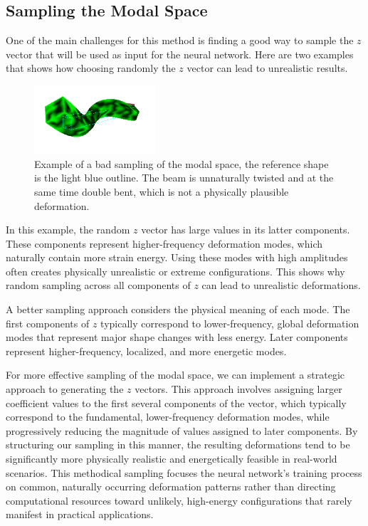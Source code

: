\subsection{Sampling the Modal Space}
\label{sec:sampling_modal_space}
One of the main challenges for this method is finding a good way to sample the \(z\) vector that will be used as input for the neural network. Here are two examples that shows how choosing randomly the \(z\) vector can lead to unrealistic results. 
\begin{figure}[H]
    \centering
    \includegraphics[width=0.4\textwidth]{Images/z_random.png}
    \caption{Example of a bad sampling of the modal space, the reference shape is the light blue outline. The beam is unnaturally twisted and at the same time double bent, which is not a physically plausible deformation.}
    \label{fig:bad_sampling}
\end{figure}
In this example, the random \(z\) vector has large values in its latter components. These components represent higher-frequency deformation modes, which naturally contain more strain energy. Using these modes with high amplitudes often creates physically unrealistic or extreme configurations. This shows why random sampling across all components of \(z\) can lead to unrealistic deformations.

A better sampling approach considers the physical meaning of each mode. The first components of \(z\) typically correspond to lower-frequency, global deformation modes that represent major shape changes with less energy. Later components represent higher-frequency, localized, and more energetic modes. 

For more effective sampling of the modal space, we can implement a strategic approach to generating the \(z\) vectors. This approach involves assigning larger coefficient values to the first several components of the vector, which typically correspond to the fundamental, lower-frequency deformation modes, while progressively reducing the magnitude of values assigned to later components. By structuring our sampling in this manner, the resulting deformations tend to be significantly more physically realistic and energetically feasible in real-world scenarios. This methodical sampling focuses the neural network's training process on common, naturally occurring deformation patterns rather than directing computational resources toward unlikely, high-energy configurations that rarely manifest in practical applications.

